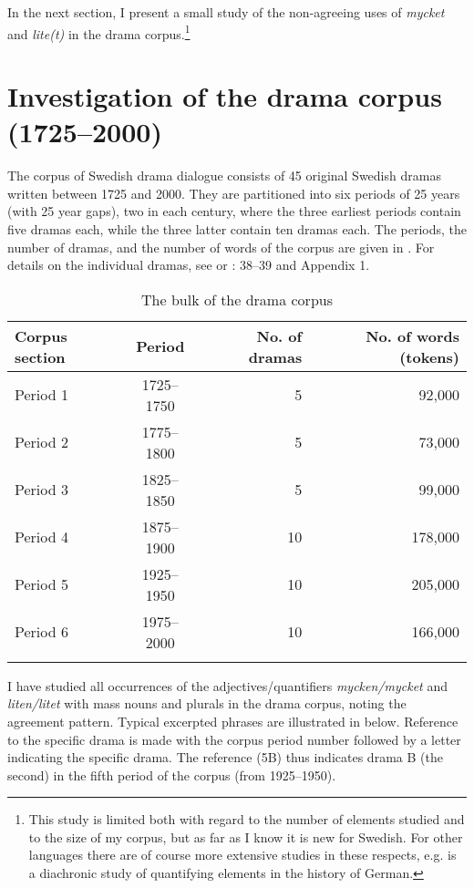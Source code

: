 \documentclass[output=paper]{langscibook}
\begin{document}
In the next section, I present a small study of the non-agreeing uses of \textit{mycket} and \textit{lite(t)} in the drama corpus.\footnote{This study is limited both with regard to the number of elements studied and to the size of my corpus, but as far as I know it is new for Swedish. For other languages there are of course more extensive studies in these respects, e.g. \citet{RoehrsSapp2016} is a diachronic study of quantifying elements in the history of German.} 


\section{Investigation of the drama corpus (1725–2000)}\label{sec:delsing:3}


The corpus of Swedish drama dialogue consists of 45 original Swedish dramas written between 1725 and 2000. They are partitioned into six periods of 25 years (with 25 year gaps), two in each century, where the three earliest periods contain five dramas each, while the three latter contain ten dramas each. The periods, the number of dramas, and the number of words of the corpus are given in . For details on the individual dramas, see \citealt{MarttalaStromquist2001} or \citealt{Stroh-Wollin2008}: 38–39 and Appendix 1.



\begin{table}
\caption{The bulk of the drama corpus\label{tab:delsing:2}}
\begin{tabular}{lcrr}
\lsptoprule
Corpus section & Period & No. of dramas & No. of words (tokens)\\
\midrule
Period 1 & 1725–1750 & 5 & 92,000\\
Period 2 & 1775–1800 & 5 & 73,000\\
Period 3 & 1825–1850 & 5 & 99,000\\
Period 4 & 1875–1900 & 10 & 178,000\\
Period 5 & 1925–1950 & 10 & 205,000\\
Period 6 & 1975–2000 & 10 & 166,000\\
\lspbottomrule
\end{tabular}
\end{table}

I have studied all occurrences of the adjectives/quantifiers \textit{mycken/mycket} and \textit{liten/litet} with mass nouns and plurals in the drama corpus, noting the agreement pattern. Typical excerpted phrases are illustrated in  below. Reference to the specific drama is made with the corpus period number followed by a letter indicating the specific drama. The reference (5B) thus indicates drama B (the second) in the fifth period of the corpus (from 1925–1950).
\end{document}
